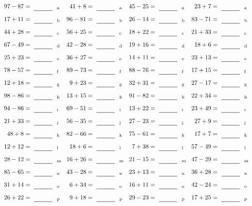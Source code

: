 \documentclass
[
  draft    = true,
  fontsize = 11pt,
  parskip  = half-
]
{scrartcl}
\begin{document}
\clearpage
\begin{align*}
    \pline{97-87}&=\rline{a}
  & \pline{41+8}&=\rline{a}
  & \pline{45-25}&=\rline{a}
  & \pline{23+7}&=\rline{a} \\[1ex]
    \pline{17+11}&=\rline{b}
  & \pline{96-81}&=\rline{b}
  & \pline{26-14}&=\rline{b}
  & \pline{83-71}&=\rline{b} \\[1ex]
    \pline{44+28}&=\rline{c}
  & \pline{56+25}&=\rline{c}
  & \pline{18+22}&=\rline{c}
  & \pline{21+33}&=\rline{c} \\[1ex]
    \pline{67-49}&=\rline{d}
  & \pline{42-28}&=\rline{d}
  & \pline{19+16}&=\rline{d}
  & \pline{18+6}&=\rline{d} \\[1ex]
    \pline{25+23}&=\rline{e}
  & \pline{36+27}&=\rline{e}
  & \pline{14+11}&=\rline{e}
  & \pline{23+13}&=\rline{e} \\[1ex]
    \pline{78-57}&=\rline{f}
  & \pline{89-73}&=\rline{f}
  & \pline{88-76}&=\rline{f}
  & \pline{17+15}&=\rline{f} \\[1ex]
    \pline{12+18}&=\rline{g}
  & \pline{9+23}&=\rline{g}
  & \pline{32+31}&=\rline{g}
  & \pline{27-17}&=\rline{g} \\[1ex]
    \pline{98-86}&=\rline{h}
  & \pline{13+15}&=\rline{h}
  & \pline{91-82}&=\rline{h}
  & \pline{22+34}&=\rline{h} \\[1ex]
    \pline{94-86}&=\rline{i}
  & \pline{69-51}&=\rline{i}
  & \pline{13+22}&=\rline{i}
  & \pline{23+49}&=\rline{i} \\[1ex]
    \pline{21+33}&=\rline{j}
  & \pline{56-35}&=\rline{j}
  & \pline{27-23}&=\rline{j}
  & \pline{27+9}&=\rline{j} \\[1ex]
    \pline{48+8}&=\rline{k}
  & \pline{82-66}&=\rline{k}
  & \pline{75-61}&=\rline{k}
  & \pline{17+7}&=\rline{k} \\[1ex]
    \pline{12+12}&=\rline{l}
  & \pline{18+6}&=\rline{l}
  & \pline{7+38}&=\rline{l}
  & \pline{57-49}&=\rline{l} \\[1ex]
    \pline{28-12}&=\rline{m}
  & \pline{16+26}&=\rline{m}
  & \pline{21-15}&=\rline{m}
  & \pline{47-29}&=\rline{m} \\[1ex]
    \pline{85-65}&=\rline{n}
  & \pline{43-28}&=\rline{n}
  & \pline{23+13}&=\rline{n}
  & \pline{36+28}&=\rline{n} \\[1ex]
    \pline{31+14}&=\rline{o}
  & \pline{6+34}&=\rline{o}
  & \pline{16+11}&=\rline{o}
  & \pline{42-24}&=\rline{o} \\[1ex]
    \pline{26+22}&=\rline{p}
  & \pline{9+18}&=\rline{p}
  & \pline{29-23}&=\rline{p}
  & \pline{17+25}&=\rline{p}
\end{align*}
\end{document}
